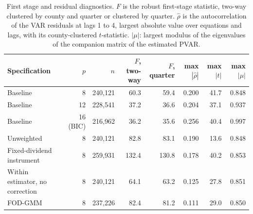 \begin{table}[ht]\centering\footnotesize
\begin{tabular}{lrrrrrrr}\toprule
Specification & $p$ & $n$ & $F$, two-way & $F$, quarter & max $|\hat\rho|$ & max $|t|$ & max $|\mu|$\\\midrule
Baseline & 8 & 240,121 & 60.3 & 59.4 & 0.200 & 41.7 & 0.848\\
Baseline & 12 & 228,541 & 37.2 & 36.6 & 0.204 & 37.1 & 0.937\\
Baseline & 16 (BIC) & 216,962 & 36.2 & 35.6 & 0.256 & 40.4 & 0.997\\
Unweighted & 8 & 240,121 & 82.8 & 83.1 & 0.190 & 13.6 & 0.848\\
Fixed-dividend instrument & 8 & 259,931 & 132.4 & 130.8 & 0.178 & 40.2 & 0.853\\
Within estimator, no correction & 8 & 240,121 & 64.1 & 63.2 & 0.125 & 27.8 & 0.851\\
FOD-GMM & 8 & 237,226 & 82.4 & 81.2 & 0.111 & 29.0 & 0.850\\
\bottomrule\end{tabular}
\caption{First stage and residual diagnostics. $F$ is the robust first-stage statistic, two-way clustered by county and quarter or clustered by quarter. $\hat\rho$ is the autocorrelation of the VAR residuals at lags 1 to 4, largest absolute value over equations and lags, with its county-clustered $t$-statistic. $|\mu|$: largest modulus of the eigenvalues of the companion matrix of the estimated PVAR.\label{tab:cns_diag}}
\end{table}
